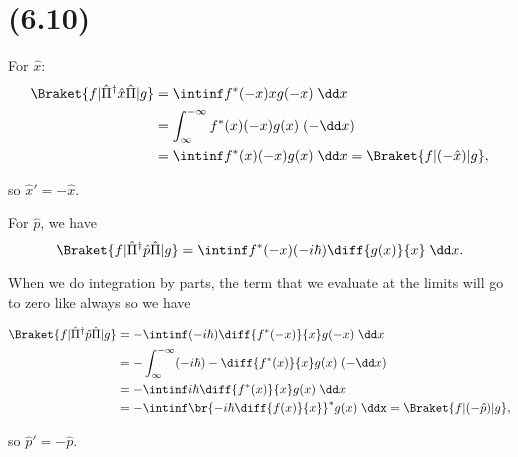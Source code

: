 \section{(6.10)}

\begin{parts}
\item For $\hat{x}$:
  \begin{align}
    \Braket{f | \hat\Pi^\dagger \hat{x} \hat\Pi | g} &= \intinf f^*(-x) x g(-x) \;\dd x \\
                                                     &= \int^{-\infty}_\infty f^*(x) (-x) g(x) \;(-\dd x) \\
                                                     &= \intinf f^*(x) (-x) g(x) \;\dd x = \Braket{f | (-\hat{x}) | g},
  \end{align}

  so $\boxed{\hat{x}'= -\hat{x}.}$

\item For $\hat{p}$, we have
  \begin{equation}
    \Braket{f |\hat\Pi^\dagger\hat{p}\hat\Pi| g} = \intinf f^*(-x) (-i\hbar) \diff{g(x)}{x} \;\dd x.
  \end{equation}

  When we do integration by parts, the term that we evaluate at the limits will go to zero like always so we have

  \begin{align}
    \Braket{f |\hat\Pi^\dagger\hat{p}\hat\Pi| g} &= -\intinf (-i\hbar) \diff{f^*(-x)}{x} g(-x) \;\dd x \\
                                                 &= -\int^{-\infty}_\infty (-i\hbar) -\diff{f^*(x)}{x} g(x) \;(-\dd x) \\
                                                 &= -\intinf i\hbar \diff{f^*(x)}{x} g(x) \;\dd x \\
    &= -\intinf \br{-i\hbar \diff{f(x)}{x}}^* g(x) \; \ddx = \Braket{f | (-\hat{p}) | g},
  \end{align}

  so $\boxed{\hat{p}' = -\hat{p}.}$

\end{parts}

